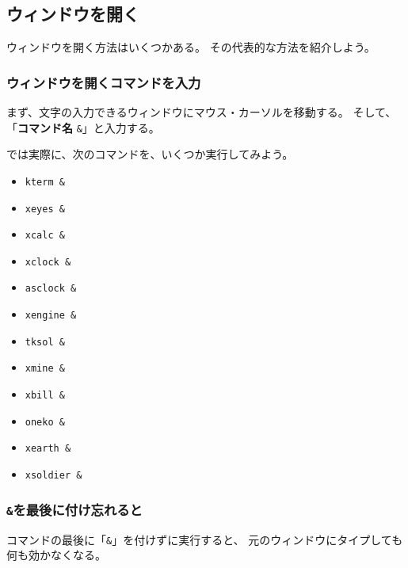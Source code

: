 \newpage

\subsection{ウィンドウを開く}

ウィンドウを開く方法はいくつかある。
その代表的な方法を紹介しよう。

\subsubsection{ウィンドウを開くコマンドを入力}

まず、文字の入力できるウィンドウにマウス・カーソルを移動する。
そして、「\textbf{コマンド名} \texttt{\&}\retrn」と入力する。

では実際に、次のコマンドを、いくつか実行してみよう。

\bigskip

\noindent
\begin{minipage}[t]{20zw}
\begin{itemize}
\item \texttt{kterm \&}\retrn
\item \texttt{xeyes \&}\retrn
\item \texttt{xcalc \&}\retrn
\item \texttt{xclock \&}\retrn
\item \texttt{asclock \&}\retrn
\item \texttt{xengine \&}\retrn
\end{itemize}
\end{minipage}
\begin{minipage}[t]{20zw}
\begin{itemize}
\item \texttt{tksol \&}\retrn
\item \texttt{xmine \&}\retrn
\item \texttt{xbill \&}\retrn
\item \texttt{oneko \&}\retrn
\item \texttt{xearth \&}\retrn
\item \texttt{xsoldier \&}\retrn
\end{itemize}
\end{minipage}

\subsubsection{\texttt{\&}を最後に付け忘れると}

コマンドの最後に「\texttt{\&}」を付けずに実行すると、
元のウィンドウにタイプしても何も効かなくなる。

